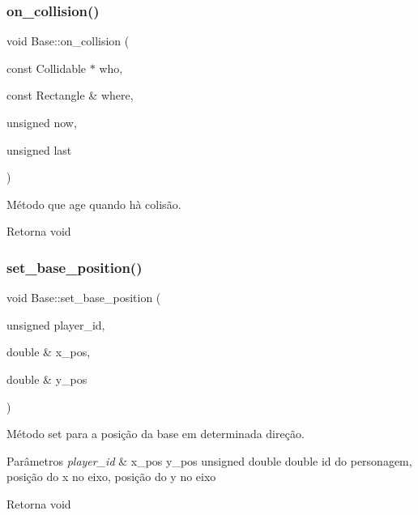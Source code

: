 \subsubsection{\texorpdfstring{on\+\_\+collision()}{on\_collision()}}
{\footnotesize\ttfamily void Base\+::on\+\_\+collision (\begin{DoxyParamCaption}\item[{const Collidable $\ast$}]{who,  }\item[{const Rectangle \&}]{where,  }\item[{unsigned}]{now,  }\item[{unsigned}]{last }\end{DoxyParamCaption})}



Método que age quando hà colisão. 

\begin{DoxyReturn}{Retorna}
void 
\end{DoxyReturn}
\mbox{\label{classBase_a3345e924d2f7897f0818d476a990f2a2}} 
\subsubsection{\texorpdfstring{set\+\_\+base\+\_\+position()}{set\_base\_position()}}
{\footnotesize\ttfamily void Base\+::set\+\_\+base\+\_\+position (\begin{DoxyParamCaption}\item[{unsigned}]{player\+\_\+id,  }\item[{double \&}]{x\+\_\+pos,  }\item[{double \&}]{y\+\_\+pos }\end{DoxyParamCaption})\hspace{0.3cm}{\ttfamily [protected]}}



Método set para a posição da base em determinada direção. 


\begin{DoxyParams}{Parâmetros}
{\em player\+\_\+id} & x\+\_\+pos y\+\_\+pos unsigned double double id do personagem, posição do x no eixo, posição do y no eixo \\
\hline
\end{DoxyParams}
\begin{DoxyReturn}{Retorna}
void 
\end{DoxyReturn}
\mbox{\label{classBase_a580dc7cdb6ff87350d04d494616839ea}} 
